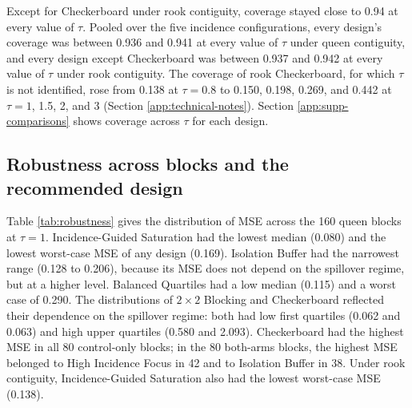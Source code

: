 \documentclass[11pt]{article}
\begin{document}
Except for Checkerboard under rook contiguity, coverage stayed close to
0.94 at every value of \(\tau\). Pooled over the five incidence
configurations, every design's coverage was between 0.936 and 0.941 at
every value of \(\tau\) under queen contiguity, and every design except
Checkerboard was between 0.937 and 0.942 at every value of \(\tau\)
under rook contiguity. The coverage of rook Checkerboard, for which
\(\tau\) is not identified, rose from 0.138 at \(\tau = 0.8\) to 0.150,
0.198, 0.269, and 0.442 at \(\tau = 1\), 1.5, 2, and 3 (Section
\ref{app:technical-notes}). Section \ref{app:supp-comparisons} shows
coverage across \(\tau\) for each design.

\subsection{Robustness across blocks and the recommended
design}\label{robustness-across-blocks-and-the-recommended-design}

Table \ref{tab:robustness} gives the distribution of MSE across the 160
queen blocks at \(\tau = 1\). Incidence-Guided Saturation had
the lowest median (0.080) and the lowest worst-case MSE of any design
(0.169). Isolation Buffer had the narrowest range (0.128 to 0.206),
because its MSE does not depend on the spillover regime, but at a higher
level. Balanced Quartiles had a low median (0.115) and a worst case of
0.290. The distributions of \(2\times2\) Blocking and Checkerboard
reflected their dependence on the spillover regime: both had low first
quartiles (0.062 and 0.063) and high upper quartiles (0.580 and 2.093).
Checkerboard had the highest MSE in all 80 control-only blocks; in the
80 both-arms blocks, the highest MSE belonged to High Incidence Focus in
42 and to Isolation Buffer in 38. Under rook contiguity,
Incidence-Guided Saturation also had the lowest worst-case MSE
(0.138).
\end{document}
